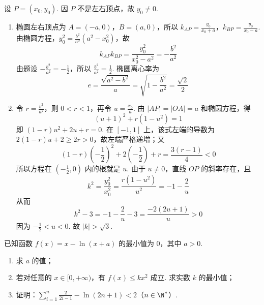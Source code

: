 \begin{solution}
设 \(P=(x_0,y_0)\). 因 \(P\) 不是左右顶点，故 \(y_0\neq0\).
\begin{enumerate}
\item 椭圆左右顶点为 \(A=(-a,0)\)，\(B=(a,0)\)，所以 \(k_{AP}=\frac{y_0}{x_0+a}\)，\(k_{BP}=\frac{y_0}{x_0-a}\).
由椭圆方程，\(y_0^2=\frac{b^2}{a^2}(a^2-x_0^2)\)，故
\[
k_{AP}k_{BP}=\frac{y_0^2}{x_0^2-a^2}=-\frac{b^2}{a^2}
\]
由题设 \(-\frac{b^2}{a^2}=-\frac12\)，所以 \(\frac{b^2}{a^2}=\frac12\). 椭圆离心率为
\[
e=\frac{\sqrt{a^2-b^2}}a=\sqrt{1-\frac{b^2}{a^2}}=\frac{\sqrt2}{2}
\]
\item 令 \(r=\frac{b^2}{a^2}\)，则 \(0<r<1\)，再令 \(u=\frac{x_0}{a}\). 由 \(|AP|=|OA|=a\) 和椭圆方程，得
\[
(u+1)^2+r(1-u^2)=1
\]
即 \((1-r)u^2+2u+r=0\). 在 \([-1,1]\) 上，该式左端的导数为 \(2(1-r)u+2\geqslant2r>0\)，故左端严格递增；又
\[
(1-r)\left(-\frac12\right)^2+2\left(-\frac12\right)+r=\frac{3(r-1)}4<0
\]
所以方程在 \((-\frac12,0)\) 内的根就是 \(u\). 由于 \(u\neq0\)，直线 \(OP\) 的斜率存在，且
\[
k^2=\frac{y_0^2}{x_0^2}=\frac{r(1-u^2)}{u^2}=-1-\frac2u
\]
从而
\[
k^2-3=-1-\frac2u-3=\frac{-2(2u+1)}u>0
\]
因为 \(-\frac12<u<0\). 故 \(|k|>\sqrt3\).
\end{enumerate}
\end{solution}

\begin{problem}
已知函数 \( f(x) = x - \ln (x + a) \) 的最小值为 0，其中 \( a > 0 \).

\begin{enumerate}
\item 求 \(a\) 的值；
\item 若对任意的 \(x \in [0, +\infty)\)，有 \(f(x) \leqslant kx^2\) 成立. 求实数 \(k\) 的最小值；
\item 证明：\(\displaystyle\sum_{i=1}^{n} \frac{2}{2i-1} - \ln(2n+1) < 2\)（\(n \in \N^*\)）.
\end{enumerate}

\end{problem}

